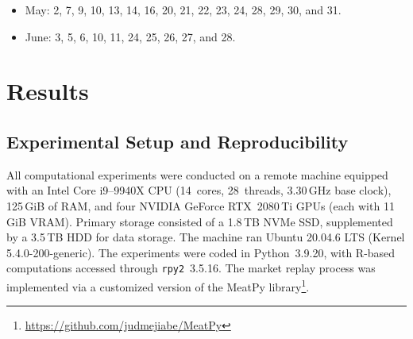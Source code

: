 \documentclass[10pt,a4paper,oneside]{article}
\providecommand{\DIFaddtex}[1]{{\protect\color{blue} \sf #1}} %
\providecommand{\DIFdeltex}[1]{{\protect\color{red} \scriptsize #1}} %
\providecommand{\DIFaddbegin}{} %
\providecommand{\DIFaddend}{} %
\providecommand{\DIFdelbegin}{} %
\providecommand{\DIFdelend}{} %
\providecommand{\DIFadd}[1]{\texorpdfstring{\DIFaddtex{#1}}{#1}} %
\providecommand{\DIFdel}[1]{\texorpdfstring{\DIFdeltex{#1}}{}} %
\newcommand{\DIFscaledelfig}{0.5}
\newlength{\DIFdelgraphicswidth} %
\newlength{\DIFdelgraphicsheight} %
\newcommand{\DIFaddincludegraphics}[2][]{{\color{blue}\fbox{\DIFOincludegraphics[#1]{#2}}}} %
\newcommand{\DIFdelincludegraphics}[2][]{%
\sbox{\DIFdelgraphicsbox}{\DIFOincludegraphics[#1]{#2}}%
\settoboxwidth{\DIFdelgraphicswidth}{\DIFdelgraphicsbox} %
\settoboxtotalheight{\DIFdelgraphicsheight}{\DIFdelgraphicsbox} %
\scalebox{\DIFscaledelfig}{%
\parbox[b]{\DIFdelgraphicswidth}{\usebox{\DIFdelgraphicsbox}\\[-\baselineskip] \rule{\DIFdelgraphicswidth}{0em}}\llap{\resizebox{\DIFdelgraphicswidth}{\DIFdelgraphicsheight}{%
\setlength{\unitlength}{\DIFdelgraphicswidth}%
\begin{picture}(1,1)%
\thicklines\linethickness{2pt} %
{\color[rgb]{1,0,0}\put(0,0){\framebox(1,1){}}}%
{\color[rgb]{1,0,0}\put(0,0){\line( 1,1){1}}}%
{\color[rgb]{1,0,0}\put(0,1){\line(1,-1){1}}}%
\end{picture}%
}\hspace*{3pt}}} %
} %
\DeclareRobustCommand{\DIFaddbegin}{\DIFOaddbegin \let\includegraphics\DIFaddincludegraphics} %
\DeclareRobustCommand{\DIFaddend}{\DIFOaddend \let\includegraphics\DIFOincludegraphics} %
\DeclareRobustCommand{\DIFdelbegin}{\DIFOdelbegin \let\includegraphics\DIFdelincludegraphics} %
\DeclareRobustCommand{\DIFdelend}{\DIFOaddend \let\includegraphics\DIFOincludegraphics} %
\begin{document}
\begin{itemize}
    \item May: 2, 7, 9, 10, 13, 14, 16, 20, 21, 22, 23, 24, 28, 29, 30, and \DIFdelbegin \DIFdel{31.
    }\DIFdelend \DIFaddbegin \DIFadd{31
    }\DIFaddend \item June: 3, 5, 6, 10, 11, 24, 25, 26, 27, and \DIFdelbegin \DIFdel{28.
}\DIFdelend \DIFaddbegin \DIFadd{28
}\DIFaddend \end{itemize}




\section{Results}
\label{sec:results}

\subsection{Experimental Setup and Reproducibility}
\label{subsec:exp_setup}

All computational experiments were conducted on a remote machine equipped with an Intel Core i9--9940X CPU (14~cores, 28~threads, 3.30\,GHz base clock), 125\,GiB of RAM, and four NVIDIA GeForce RTX~2080\,Ti GPUs (each with 11\,GiB VRAM). Primary storage consisted of a 1.8\,TB NVMe SSD, supplemented by a 3.5\,TB HDD for data storage. The machine ran Ubuntu 20.04.6 LTS (Kernel 5.4.0-200-generic). The experiments were coded in Python~3.9.20, with R-based computations accessed through \verb|rpy2|~3.5.16. The market replay process was implemented via a customized version of the MeatPy library\footnote{\url{https://github.com/judmejiabe/MeatPy}}.
\end{document}
